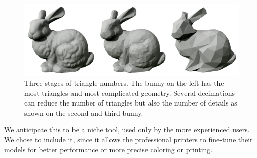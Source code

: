 \begin{figure}
	\centering
	\includegraphics[scale=0.25]{images/decimated_bunny.png}
	\caption{Three stages of triangle numbers. The bunny on the left has the most triangles and most complicated geometry. Several decimations can reduce the number of triangles but also the number of details as shown on the second and third bunny.}
	\label{fig:decimated}
\end{figure}

We anticipate this to be a niche tool, used only by the more experienced users. We chose to include it, since it allows the professional printers to fine-tune their models for better performance or more precise coloring or printing.